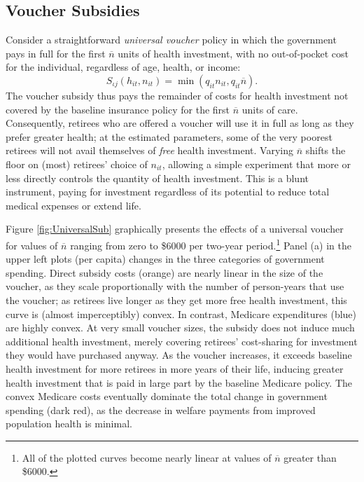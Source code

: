 \documentclass[12pt,pdftex,letterpaper]{article}
\newcommand{\Type}{\iota}
\newcommand{\Health}{h}
\newcommand{\Invst}{n}
\newcommand{\Copay}{q}
\newcommand{\Subsidy}{S}
\newcommand{\Age}{j}
\begin{document}
\subsection{Voucher Subsidies}
\label{sec:Voucher}

Consider a straightforward \textit{universal voucher} policy in which the government pays in full for the first $\overline{\Invst}$ units of health investment, with no out-of-pocket cost for the individual, regardless of age, health, or income:
\begin{equation}
\Subsidy_{\Type \Age}(\Health_{it},\Invst_{it})  = \min(\Copay_{it}\Invst_{it},\Copay_{it}\overline{\Invst}).
\end{equation}
The voucher subsidy thus pays the remainder of costs for health investment not covered by the baseline insurance policy for the first $\overline{\Invst}$ units of care.  Consequently, retirees who are offered a voucher will use it in full as long as they prefer greater health; at the estimated parameters, some of the very poorest retirees will not avail themselves of \textit{free} health investment.  Varying $\overline{\Invst}$ shifts the floor on (most) retirees' choice of $\Invst_{it}$, allowing a simple experiment that more or less directly controls the quantity of health investment.  This is a blunt instrument, paying for investment regardless of its potential to reduce total medical expenses or extend life.

Figure \ref{fig:UniversalSub} graphically presents the effects of a universal voucher for values of $\overline{\Invst}$ ranging from zero to \$6000 per two-year period.\footnote{All of the plotted curves become nearly linear at values of $\overline{\Invst}$ greater than \$6000.}  Panel (a) in the upper left plots (per capita) changes in the three categories of government spending.  Direct subsidy costs (orange) are nearly linear in the size of the voucher, as they scale proportionally with the number of person-years that use the voucher; as retirees live longer as they get more free health investment, this curve is (almost imperceptibly) convex.  In contrast, Medicare expenditures (blue) are highly convex. At very small voucher sizes, the subsidy does not induce much additional health investment, merely covering retirees' cost-sharing for investment they would have purchased anyway. As the voucher increases, it exceeds baseline health investment for more retirees in more years of their life, inducing greater health investment that is paid in large part by the baseline Medicare policy.  The convex Medicare costs  eventually dominate the total change in government spending (dark red), as the decrease in welfare payments from improved population health is minimal.
\end{document}
